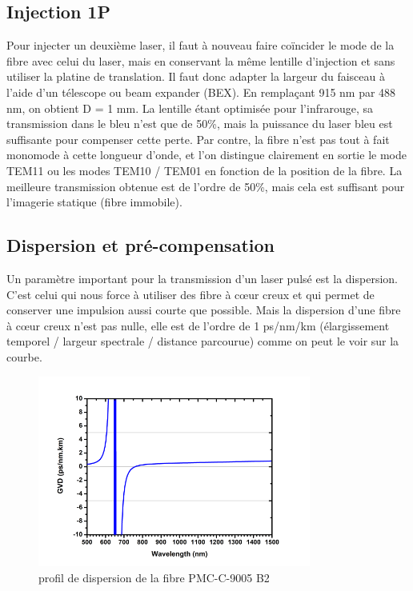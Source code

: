 \subsection{Injection 1P}


Pour injecter un deuxième laser, il faut à nouveau faire coïncider le mode de la fibre avec celui du laser, mais en conservant la même lentille d'injection et sans utiliser la platine de translation. Il faut donc adapter la largeur du faisceau à l'aide d'un télescope ou beam expander (BEX). En remplaçant 915 nm par 488 nm, on obtient D = 1 mm. La lentille étant optimisée pour l'infrarouge, sa transmission dans le bleu n'est que de 50\%, mais la puissance du laser bleu est suffisante pour compenser cette perte. Par contre, la fibre n'est pas tout à fait monomode à cette longueur d'onde, et l'on distingue clairement en sortie le mode TEM11 ou les modes TEM10 / TEM01 en fonction de la position de la fibre. La meilleure transmission obtenue est de l'ordre de 50\%, mais cela est suffisant pour l'imagerie statique (fibre immobile).

\subsection{Dispersion et pré-compensation}

Un paramètre important pour la transmission d'un laser pulsé est la dispersion. C'est celui qui nous force à utiliser des fibre à cœur creux et qui permet de conserver une impulsion aussi courte que possible. Mais la dispersion d'une fibre à cœur creux n'est pas nulle, elle est de l'ordre de 1 ps/nm/km (élargissement temporel / largeur spectrale / distance parcourue) comme on peut le voir sur la courbe.

\begin{figure}
\centering
\includegraphics[width=0.8\textwidth]{./files/fiber-dispersion.png}
\caption{profil de dispersion de la fibre PMC-C-9005 B2}
\end{figure}

